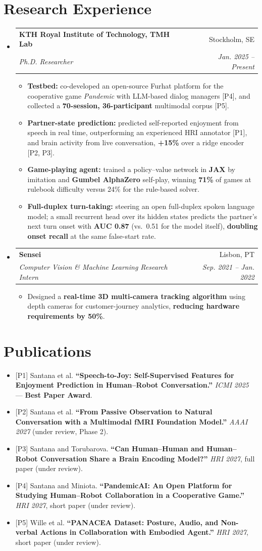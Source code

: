 \documentclass[letterpaper,11pt]{article}
\makeatletter
\newcommand{\resumeItem}[1]{
  \item\small{
    {#1 \vspace{-2pt}}
  }
}
\newcommand{\resumeSubheading}[4]{
  \vspace{-2pt}\item
    \begin{tabular*}{0.97\textwidth}[t]{l@{\extracolsep{\fill}}r}
      \textbf{#1} & #2 \\
      \textit{\small#3} & \textit{\small #4} \\
    \end{tabular*}\vspace{-7pt}
}
\newcommand{\resumeSubHeadingListStart}{\begin{itemize}[leftmargin=0.15in, label={}]}
\newcommand{\resumeSubHeadingListEnd}{\end{itemize}}
\newcommand{\resumeItemListStart}{\begin{itemize}}
\newcommand{\resumeItemListEnd}{\end{itemize}\vspace{-5pt}}
\makeatother
\begin{document}
\section{Research Experience}
  \resumeSubHeadingListStart

  \resumeSubheading
      {KTH Royal Institute of Technology, TMH Lab}{Stockholm, SE}
      {Ph.D. Researcher}{Jan. 2025 -- Present}
      \resumeItemListStart
        \resumeItem{\textbf{Testbed:} co-developed an open-source Furhat platform for the cooperative game \emph{Pandemic} with LLM-based dialog managers [P4], and collected a \textbf{70-session, 36-participant} multimodal corpus [P5].}
        \resumeItem{\textbf{Partner-state prediction:} predicted self-reported enjoyment from speech in real time, outperforming an experienced HRI annotator [P1], and brain activity from live conversation, \textbf{+15\%} over a ridge encoder [P2, P3].}
        \resumeItem{\textbf{Game-playing agent:} trained a policy--value network in \textbf{JAX} by imitation and \textbf{Gumbel AlphaZero} self-play, winning \textbf{71\%} of games at rulebook difficulty versus 24\% for the rule-based solver.}
        \resumeItem{\textbf{Full-duplex turn-taking:} steering an open full-duplex spoken language model; a small recurrent head over its hidden states predicts the partner's next turn onset with \textbf{AUC 0.87} (vs.\ 0.51 for the model itself), \textbf{doubling onset recall} at the same false-start rate.}
      \resumeItemListEnd

  \resumeSubheading
      {Sensei}{Lisbon, PT}
      {Computer Vision \& Machine Learning Research Intern}{Sep. 2021 -- Jan. 2022}
      \resumeItemListStart
        \resumeItem{Designed a \textbf{real-time 3D multi-camera tracking algorithm} using depth cameras for customer-journey analytics, \textbf{reducing hardware requirements by 50\%}.}
      \resumeItemListEnd

  \resumeSubHeadingListEnd

\section{Publications}
\resumeSubHeadingListStart
  \resumeItem{[P1] Santana et al. \textbf{``Speech-to-Joy: Self-Supervised Features for Enjoyment Prediction in Human--Robot Conversation.''} \textit{ICMI 2025} --- \textbf{Best Paper Award}.}
  \resumeItem{[P2] Santana et al. \textbf{``From Passive Observation to Natural Conversation with a Multimodal fMRI Foundation Model.''} \textit{AAAI 2027} (under review, Phase 2).}
  \resumeItem{[P3] Santana and Torubarova. \textbf{``Can Human--Human and Human--Robot Conversation Share a Brain Encoding Model?''} \textit{HRI 2027}, full paper (under review).}
  \resumeItem{[P4] Santana and Miniota. \textbf{``PandemicAI: An Open Platform for Studying Human--Robot Collaboration in a Cooperative Game.''} \textit{HRI 2027}, short paper (under review).}
  \resumeItem{[P5] Wille et al. \textbf{``PANACEA Dataset: Posture, Audio, and Non-verbal Actions in Collaboration with Embodied Agent.''} \textit{HRI 2027}, short paper (under review).}
\resumeSubHeadingListEnd
\end{document}
